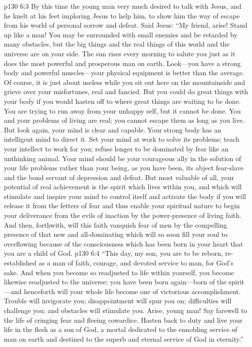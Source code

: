\vs p130 6:3 By this time the young man very much desired to talk with Jesus, and he knelt at his feet imploring Jesus to help him, to show him the way of escape from his world of personal sorrow and defeat. Said Jesus: “My friend, arise! Stand up like a man! You may be surrounded with small enemies and be retarded by many obstacles, but the big things and the real things of this world and the universe are on your side. The sun rises every morning to salute you just as it does the most powerful and prosperous man on earth. Look---you have a strong body and powerful muscles---your physical equipment is better than the average. Of course, it is just about useless while you sit out here on the mountainside and grieve over your misfortunes, real and fancied. But you could do great things with your body if you would hasten off to where great things are waiting to be done. You are trying to run away from your unhappy self, but it cannot be done. You and your problems of living are real; you cannot escape them as long as you live. But look again, your mind is clear and capable. Your strong body has an intelligent mind to direct it. Set your mind at work to solve its problems; teach your intellect to work for you; refuse longer to be dominated by fear like an unthinking animal. Your mind should be your courageous ally in the solution of your life problems rather than your being, as you have been, its abject fear\hyp{}slave and the bond servant of depression and defeat. But most valuable of all, your potential of real achievement is the spirit which lives within you, and which will stimulate and inspire your mind to control itself and activate the body if you will release it from the fetters of fear and thus enable your spiritual nature to begin your deliverance from the evils of inaction by the power\hyp{}presence of living faith. And then, forthwith, will this faith vanquish fear of men by the compelling presence of that new and all\hyp{}dominating  which will so soon fill your soul to overflowing because of the consciousness which has been born in your heart that you are a child of God.
\vs p130 6:4 \textcolor{ubdarkred}{“This day, my son, you are to be reborn, re\hyp{}established as a man of faith, courage, and devoted service to man, for God’s sake. And when you become so readjusted to life within yourself, you become likewise readjusted to the universe; you have been born again---born of the spirit---and henceforth will your whole life become one of victorious accomplishment. Trouble will invigorate you; disappointment will spur you on; difficulties will challenge you; and obstacles will stimulate you. Arise, young man! Say farewell to the life of cringing fear and fleeing cowardice. Hasten back to duty and live your life in the flesh as a son of God, a mortal dedicated to the ennobling service of man on earth and destined to the superb and eternal service of God in eternity.”}
